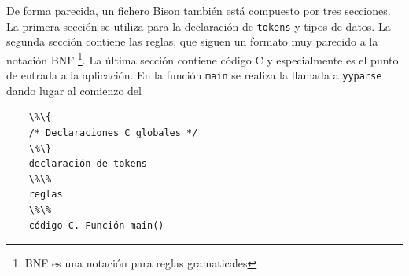 De forma parecida, un fichero Bison también está compuesto por tres secciones. La primera sección se utiliza para la declaración de \verb|tokens| y tipos de datos. La segunda sección contiene las reglas, que siguen un formato muy parecido a la notación BNF \footnote{BNF es una notación para reglas gramaticales}. La última sección contiene código C y especialmente es el punto de entrada a la aplicación. En la función \verb|main| se realiza la llamada a \verb|yyparse| dando lugar al comienzo del %

\begin{verbatim}
    \%\{
    /* Declaraciones C globales */
    \%\}
    declaración de tokens
    \%\%
    reglas
    \%\%
    código C. Función main()
\end{verbatim}

%
%
